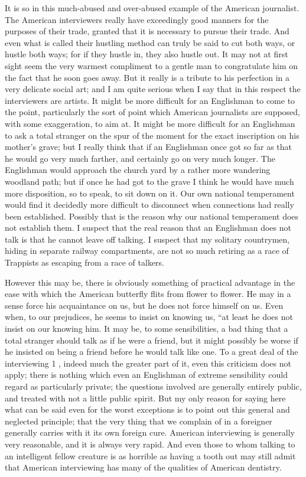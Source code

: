 \documentclass{book}
\begin{document}
It is so in this much-abused and over-abused example of the American journalist. The American interviewers really have exceedingly good manners for the purposes of their trade, granted that it is necessary to pursue their trade. And even what is called their hustling method can truly be said to cut both ways, or hustle both ways; for if they hustle in, they also hustle out. It may not at first sight seem the very warmest compliment to a gentle man to congratulate him on the fact that he soon goes away. But it really is a tribute to his perfection in a very delicate social art; and I am quite serious when I say that in this respect the interviewers are artists. It might be more difficult for an Englishman to come to the point, particularly the sort of point which American journalists are supposed, with some exaggeration, to aim at. It might be more difficult for an Englishman to ask a total stranger on the spur of the moment for the exact inscription on his mother’s grave; but I really think that if an Englishman once got so far as that he would go very much farther, and certainly go on very much longer. The Englishman would approach the church yard by a rather more wandering woodland path; but if once he had got to the grave I think he would have much more disposition, so to speak, to sit down on it. Our own national temperament would find it decidedly more difficult to disconnect when connections had really been established. Possibly that is the reason why our national temperament does not establish them. I suspect that the real reason that an Englishman does not talk is that he cannot leave off talking. I suspect that my solitary countrymen, hiding in separate railway compartments, are not so much retiring as a race of Trappists as escaping from a race of talkers.

However this may be, there is obviously something of practical advantage in the ease with which the American butterfly flits from flower to flower. He may in a sense force his acquaintance on us, but he does not force himself on us. Even when, to our prejudices, he seems to insist on knowing us, “at least he does not insist on our knowing him. It may be, to some sensibilities, a bad thing that a total stranger should talk as if he were a friend, but it might possibly be worse if he insisted on being a friend before he would talk like one. To a great deal of the interviewing 1 , indeed much the greater part of it, even this criticism does not apply; there is nothing which even an Englishman of extreme sensibility could regard as particularly private; the questions involved are generally entirely public, and treated with not a little public spirit. But my only reason for saying here what can be said even for the worst exceptions is to point out this general and neglected principle; that the very thing that we complain of in a foreigner generally carries with it its own foreign cure. American interviewing is generally very reasonable, and it is always very rapid. And even those to whom talking to an intelligent fellow creature is as horrible as having a tooth out may still admit that American interviewing has many of the qualities of American dentistry.
\end{document}
